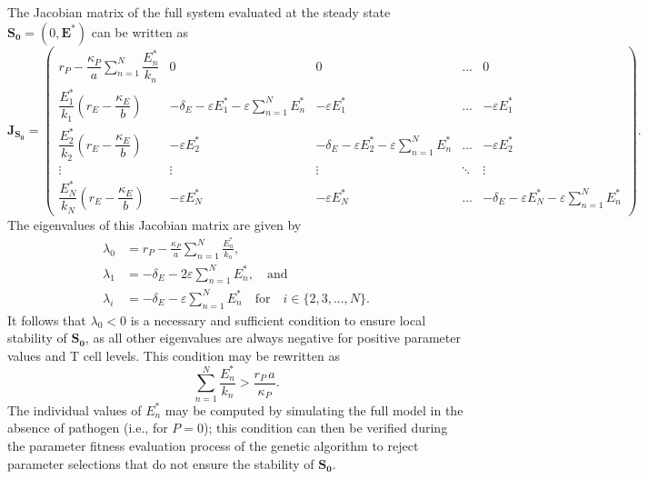 The Jacobian matrix of the full system evaluated at the steady state $\boldsymbol{S_0} = (0, \boldsymbol{E^*})$ can be written as
%
\setlength{\arraycolsep}{1.6mm}
\begin{equation*}
    \mathbf{J}_{\boldsymbol{S_0}} = 
    \begin{pmatrix}
        r_P - \dfrac{\kappa_P}{a} \displaystyle\sum_{n=1}^N \dfrac{E_n^*}{k_n} & 0 & 0 & ... & 0 \\[1.5em]
        \dfrac{E_1^*}{k_1}\left( r_E - \dfrac{\kappa_E}{b} \right) & -\delta_E - \varepsilon E_1^* - \varepsilon \displaystyle\sum_{n=1}^N E_n^* & - \varepsilon E_1^* & ... & - \varepsilon E_1^* \\[1.5em]
        \dfrac{E_2^*}{k_2}\left( r_E - \dfrac{\kappa_E}{b} \right) & - \varepsilon E_2^*  & -\delta_E - \varepsilon E_2^* - \varepsilon \displaystyle\sum_{n=1}^N E_n^* & ... & - \varepsilon E_2^* \\[1.5em]
        \vdots & \vdots & \vdots & \ddots & \vdots \\[1.5em]
        \dfrac{E_N^*}{k_N}\left( r_E - \dfrac{\kappa_E}{b} \right) & - \varepsilon E_N^* & - \varepsilon E_N^* & ... & -\delta_E - \varepsilon E_N^* - \varepsilon \displaystyle\sum_{n=1}^N E_n^*
    \end{pmatrix}.
\end{equation*}
%
The eigenvalues of this Jacobian matrix are given by
%
\begin{align*}
    \lambda_0 &= r_P - \frac{\kappa_P}{a} \sum_{n=1}^N \frac{E_n^*}{k_n},\\[0.5em]
    \lambda_1 &= -\delta_E - 2\varepsilon\sum_{n=1}^N E_n^*, \quad \textrm{and}\\[0.5em]
    \lambda_i &= -\delta_E - \varepsilon\sum_{n=1}^N E_n^* \quad \textrm{for} \quad i\in\{2,3,...,N\}.
\end{align*}
%
It follows that $\lambda_0<0$ is a necessary and sufficient condition to ensure local stability of $\boldsymbol{S_0}$, as all other eigenvalues are always negative for positive parameter values and T cell levels. This condition may be rewritten as
%
\begin{equation*}
    \sum_{n=1}^N \frac{E_n^*}{k_n} > \frac{r_P \, a}{\kappa_P}.
\end{equation*}
%
The individual values of $E_n^*$ may be computed by simulating the full model in the absence of pathogen (i.e., for $P=0$); this condition can then be verified during the parameter fitness evaluation process of the genetic algorithm to reject parameter selections that do not ensure the stability of $\boldsymbol{S_0}$.

